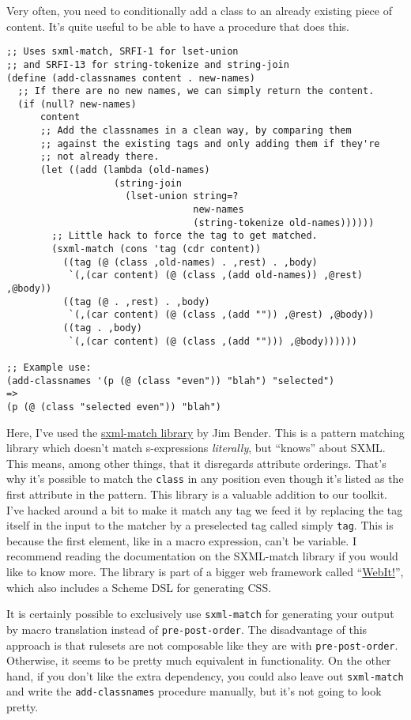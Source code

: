 \documentclass{article}
\begin{document}
Very often, you need to conditionally add a class to an already
existing piece of content.  It's quite useful to be able to have a
procedure that does this.

\begin{verbatim}
;; Uses sxml-match, SRFI-1 for lset-union
;; and SRFI-13 for string-tokenize and string-join
(define (add-classnames content . new-names)
  ;; If there are no new names, we can simply return the content.
  (if (null? new-names)
      content
      ;; Add the classnames in a clean way, by comparing them
      ;; against the existing tags and only adding them if they're
      ;; not already there.
      (let ((add (lambda (old-names)
                   (string-join
                     (lset-union string=?
                                 new-names
                                 (string-tokenize old-names))))))
        ;; Little hack to force the tag to get matched.
        (sxml-match (cons 'tag (cdr content))
          ((tag (@ (class ,old-names) . ,rest) . ,body)
           `(,(car content) (@ (class ,(add old-names)) ,@rest) ,@body))
          ((tag (@ . ,rest) . ,body)
           `(,(car content) (@ (class ,(add "")) ,@rest) ,@body))
          ((tag . ,body)
           `(,(car content) (@ (class ,(add ""))) ,@body))))))

;; Example use:
(add-classnames '(p (@ (class "even")) "blah") "selected")
=>
(p (@ (class "selected even")) "blah")
\end{verbatim}

Here, I've used the
\href{http://celtic.benderweb.net/sxml-match/manual/index.html}{sxml-match
  library} by Jim Bender.  This is a pattern matching library which
doesn't match s-expressions \emph{literally}, but ``knows'' about
SXML.  This means, among other things, that it disregards attribute
orderings.  That's why it's possible to match the \verb|class| in any
position even though it's listed as the first attribute in the
pattern.  This library is a valuable addition to our toolkit.  I've
hacked around a bit to make it match any tag we feed it by replacing
the tag itself in the input to the matcher by a preselected tag called
simply \verb|tag|.  This is because the first element, like in a macro
expression, can't be variable.  I recommend reading the documentation
on the SXML-match library if you would like to know more.  The library
is part of a bigger web framework called
``\href{http://celtic.benderweb.net/webit}{WebIt!}'', which also
includes a Scheme DSL for generating CSS.

It is certainly possible to exclusively use \verb|sxml-match| for
generating your output by macro translation instead of
\verb|pre-post-order|.  The disadvantage of this approach is that
rulesets are not composable like they are with \verb|pre-post-order|.
Otherwise, it seems to be pretty much equivalent in functionality.  On
the other hand, if you don't like the extra dependency, you could also
leave out \verb|sxml-match| and write the \verb|add-classnames|
procedure manually, but it's not going to look pretty.
\end{document}
